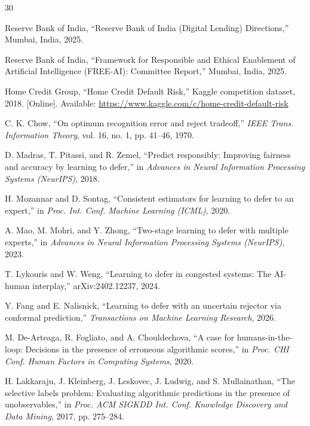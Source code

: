 \documentclass[conference]{IEEEtran}
\begin{document}
\begin{thebibliography}{30}

 Reserve Bank of India, ``Reserve Bank of India (Digital
Lending) Directions,'' Mumbai, India, 2025.

 Reserve Bank of India, ``Framework for Responsible and
Ethical Enablement of Artificial Intelligence (FREE-AI): Committee Report,''
Mumbai, India, 2025.

 Home Credit Group, ``Home Credit Default Risk,'' Kaggle
competition dataset, 2018. [Online]. Available:
\url{https://www.kaggle.com/c/home-credit-default-risk}

 C. K. Chow, ``On optimum recognition error and reject
tradeoff,'' \emph{IEEE Trans. Information Theory}, vol. 16, no. 1, pp.
41--46, 1970.

 D. Madras, T. Pitassi, and R. Zemel, ``Predict
responsibly: Improving fairness and accuracy by learning to defer,'' in
\emph{Advances in Neural Information Processing Systems (NeurIPS)}, 2018.

 H. Mozannar and D. Sontag, ``Consistent estimators for
learning to defer to an expert,'' in \emph{Proc. Int. Conf. Machine Learning
(ICML)}, 2020.

 A. Mao, M. Mohri, and Y. Zhong, ``Two-stage learning to
defer with multiple experts,'' in \emph{Advances in Neural Information
Processing Systems (NeurIPS)}, 2023.

 T. Lykouris and W. Weng, ``Learning to defer in
congested systems: The AI-human interplay,'' arXiv:2402.12237, 2024.

 Y. Fang and E. Nalisnick, ``Learning to defer with an
uncertain rejector via conformal prediction,'' \emph{Transactions on Machine
Learning Research}, 2026.

 M. De-Arteaga, R. Fogliato, and A. Chouldechova, ``A
case for humans-in-the-loop: Decisions in the presence of erroneous
algorithmic scores,'' in \emph{Proc. CHI Conf. Human Factors in Computing
Systems}, 2020.

 H. Lakkaraju, J. Kleinberg, J. Leskovec, J. Ludwig,
and S. Mullainathan, ``The selective labels problem: Evaluating algorithmic
predictions in the presence of unobservables,'' in \emph{Proc. ACM SIGKDD
Int. Conf. Knowledge Discovery and Data Mining}, 2017, pp. 275--284.


\end{thebibliography}
\end{document}
